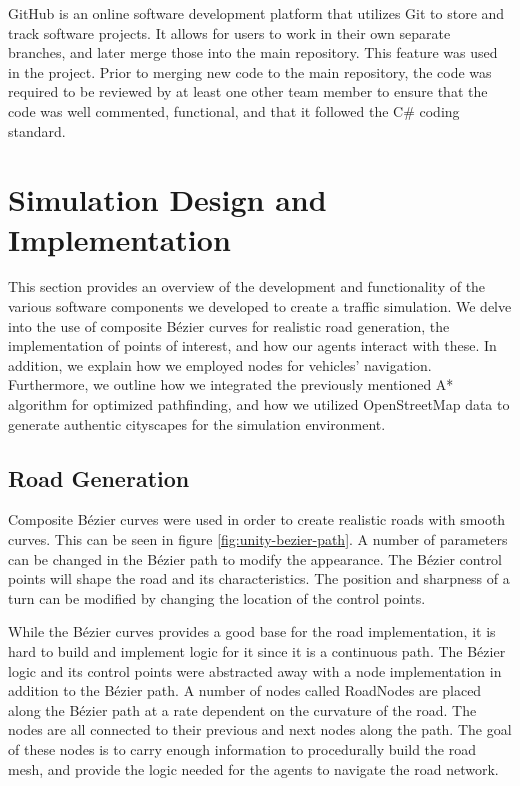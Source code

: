         GitHub\cite{github} is an online software development platform that utilizes Git to store and track software projects. It allows for users to work in their own separate branches, and later merge those into the main repository. This feature was used in the project. Prior to merging new code to the main repository, the code was required to be reviewed by at least one other team member to ensure that the code was well commented, functional, and that it followed the C\# coding standard.


\section{Simulation Design and Implementation}
    This section provides an overview of the development and functionality of the various software components we developed to create a traffic simulation. We delve into the use of composite Bézier curves for realistic road generation, the implementation of points of interest, and how our agents interact with these. In addition, we explain how we employed nodes for vehicles' navigation. Furthermore, we outline how we integrated the previously mentioned A* algorithm for optimized pathfinding, and how we utilized OpenStreetMap data to generate authentic cityscapes for the simulation environment.



    \subsection{Road Generation}
        Composite Bézier curves were used in order to create realistic roads with smooth curves. This can be seen in figure \ref{fig:unity-bezier-path}. A number of parameters can be changed in the Bézier path to modify the appearance. The Bézier control points will shape the road and its characteristics. The position and sharpness of a turn can be modified by changing the location of the control points.
        
    
        While the Bézier curves provides a good base for the road implementation, it is hard to build and implement logic for it since it is a continuous path. The Bézier logic and its control points were abstracted away with a node implementation in addition to the Bézier path. A number of nodes called RoadNodes are placed along the Bézier path at a rate dependent on the curvature of the road. The nodes are all connected to their previous and next nodes along the path. The goal of these nodes is to carry enough information to procedurally build the road mesh, and provide the logic needed for the agents to navigate the road network.
    
